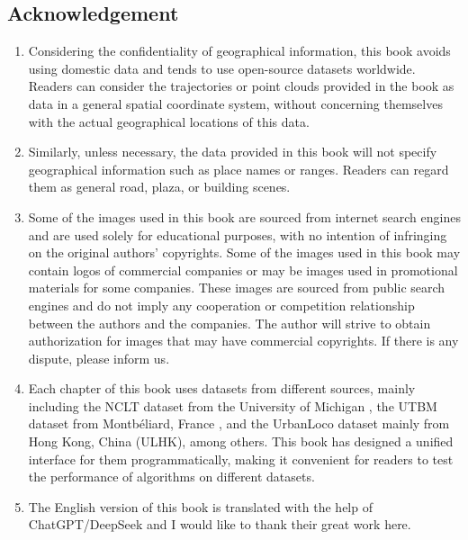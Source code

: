 \subsection*{Acknowledgement}
\begin{enumerate}
	\item Considering the confidentiality of geographical information, this book avoids using domestic data and tends to use open-source datasets worldwide. Readers can consider the trajectories or point clouds provided in the book as data in a general spatial coordinate system, without concerning themselves with the actual geographical locations of this data.
	\item Similarly, unless necessary, the data provided in this book will not specify geographical information such as place names or ranges. Readers can regard them as general road, plaza, or building scenes.
	\item Some of the images used in this book are sourced from internet search engines and are used solely for educational purposes, with no intention of infringing on the original authors' copyrights. Some of the images used in this book may contain logos of commercial companies or may be images used in promotional materials for some companies. These images are sourced from public search engines and do not imply any cooperation or competition relationship between the authors and the companies. The author will strive to obtain authorization for images that may have commercial copyrights. If there is any dispute, please inform us.
	\item Each chapter of this book uses datasets from different sources, mainly including the NCLT dataset from the University of Michigan \cite{CarlevarisBianco2015}, the UTBM dataset from Montbéliard, France \cite{Yan2020}, and the UrbanLoco dataset mainly from Hong Kong, China \cite{Wen2020} (ULHK), among others. This book has designed a unified interface for them programmatically, making it convenient for readers to test the performance of algorithms on different datasets.
	\item The English version of this book is translated with the help of ChatGPT/DeepSeek and I would like to thank their great work here.
\end{enumerate}
